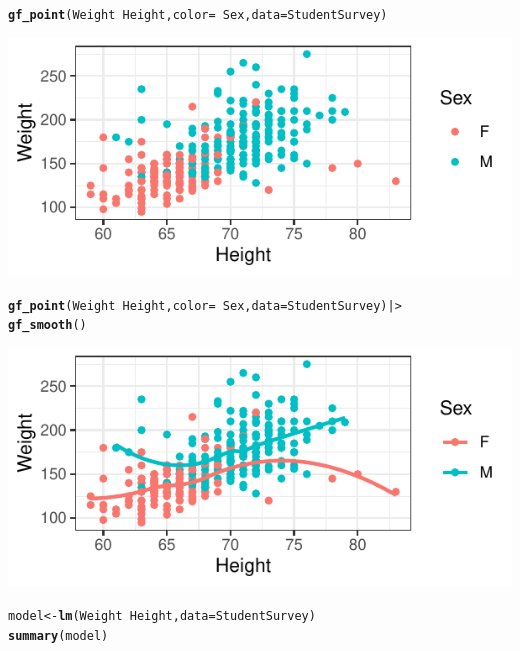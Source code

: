 \documentclass[10pt]{report}\usepackage[]{graphicx}\usepackage[]{xcolor}
\makeatletter
\newcommand{\hlopt}[1]{\textcolor[rgb]{0,0,0}{#1}}%
\newcommand{\hldef}[1]{\textcolor[rgb]{0.345,0.345,0.345}{#1}}%
\newcommand{\hlkwb}[1]{\textcolor[rgb]{0.69,0.353,0.396}{#1}}%
\newcommand{\hlkwc}[1]{\textcolor[rgb]{0.333,0.667,0.333}{#1}}%
\newcommand{\hlkwd}[1]{\textcolor[rgb]{0.737,0.353,0.396}{\textbf{#1}}}%
\newenvironment{kframe}{%
 \def\at@end@of@kframe{}%
 \ifinner\ifhmode%
  \def\at@end@of@kframe{\end{minipage}}%
  \begin{minipage}{\columnwidth}%
 \fi\fi%
 \def\FrameCommand##1{\hskip\@totalleftmargin \hskip-\fboxsep
 \colorbox{shadecolor}{##1}\hskip-\fboxsep
     \hskip-\linewidth \hskip-\@totalleftmargin \hskip\columnwidth}%
 \MakeFramed {\advance\hsize-\width
   \@totalleftmargin\z@ \linewidth\hsize
   \@setminipage}}%
 {\par\unskip\endMakeFramed%
 \at@end@of@kframe}
\newenvironment{knitrout}{}{} %
\makeatother
\begin{document}
\newpage
{}
\begin{multicols}{2}


\begin{knitrout}\small
{}\color{fgcolor}\begin{kframe}
\begin{alltt}
\hlkwd{gf_point}\hldef{(Weight} \hlopt{~} \hldef{Height,} \hlkwc{color} \hldef{=} \hlopt{~} \hldef{Sex,} \hlkwc{data} \hldef{= StudentSurvey)}
\end{alltt}
\end{kframe}

{\centering \includegraphics[width=.25\textwidth,height=.125\textwidth]{figure/unnamed-chunk-33-1} 

}


\end{knitrout}
\vspace*{-.20in}
\begin{knitrout}\footnotesize
{}\color{fgcolor}\begin{kframe}
\begin{alltt}
\hlkwd{gf_point}\hldef{(Weight} \hlopt{~} \hldef{Height,} \hlkwc{color} \hldef{=} \hlopt{~} \hldef{Sex,} \hlkwc{data} \hldef{= StudentSurvey)  |>}
  \hlkwd{gf_smooth}\hldef{()}
\end{alltt}
\end{kframe}

{\centering \includegraphics[width=.25\textwidth,height=.125\textwidth]{figure/unnamed-chunk-34-1} 

}


\end{knitrout}

\begin{knitrout}\small
{}\color{fgcolor}\begin{kframe}
\begin{alltt}
\hldef{model} \hlkwb{<-} \hlkwd{lm}\hldef{(Weight} \hlopt{~} \hldef{Height,} \hlkwc{data} \hldef{= StudentSurvey)}
\hlkwd{summary}\hldef{(model)}
\end{alltt}
\begin{verbatim}


\end{verbatim}
\end{kframe}
\end{knitrout}
\end{multicols}
\end{document}
